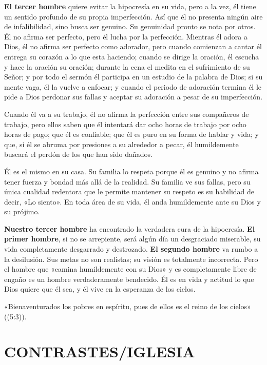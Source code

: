 \documentclass[12pt, twoside, openright]{book}
\begin{document}
\textbf{El tercer hombre} quiere evitar la hipocresía en su vida, pero a la vez, él tiene un sentido profundo de su propia imperfección. Así que él no presenta ningún aire de infalibilidad, sino busca ser genuino. Su genuinidad pronto se nota por otros. Él no afirma ser perfecto, pero él lucha por la perfección. Mientras él adora a Dios, él no afirma ser perfecto como adorador, pero cuando comienzan a cantar él entrega su corazón a lo que esta haciendo; cuando se dirige la oración, él escucha y hace la oración su oración; durante la cena el medita en el sufrimiento de su Señor; y por todo el sermón él participa en un estudio de la palabra de Dios; si su mente vaga, él la vuelve a enfocar; y cuando el periodo de adoración termina él le pide a Dios perdonar sus fallas y aceptar su adoración a pesar de su imperfección. 

Cuando él va a su trabajo, él no afirma la perfección entre sus compañeros de trabajo, pero ellos saben que él intentará dar ocho horas de trabajo por ocho horas de pago; que él es confiable; que él es puro en su forma de hablar y vida; y que, si él se abruma por presiones a su alrededor a pecar, él humildemente buscará el perdón de los que han sido dañados. 

Él es el mismo en su casa. Su familia lo respeta porque él es genuino y no afirma tener fuerza y bondad más allá de la realidad. Su familia ve sus fallas, pero su única cualidad redentora que le permite mantener su respeto es su habilidad de decir, «Lo siento». En toda área de su vida, él anda humildemente ante su Dios y su prójimo. 

\textbf{Nuestro tercer hombre} ha encontrado la verdadera cura de la hipocresía. \textbf{El primer hombre}, si no se arrepiente, será algún día un desgraciado miserable, su vida completamente desgarrado y destrozado. \textbf{El segundo hombre} va rumbo a la desilusión. Sus metas no son realistas; su visión es totalmente incorrecta. Pero el hombre que «camina humildemente con su Dios» y es completamente libre de engaño es un hombre verdaderamente bendecido. Él es en vida y actitud lo que Dios quiere que él sea, y él vive en la esperanza de los cielos. 

«Bienaventurados los pobres en espíritu, pues de ellos es el reino de los cielos» ((5:3)).

\chapter{CONTRASTES/IGLESIA}
\end{document}
